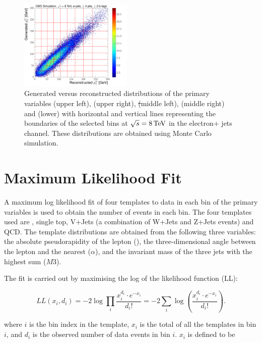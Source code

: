 \begin{figure}[hbtp]
	 \includegraphics[width=0.48\textwidth]{Chapters/04_Analysis/04b_XSections/images/binning/electron_WPT_8TeV.pdf}\hfill
	 \caption{Generated versus reconstructed distributions of the primary variables \met (upper left), \HT (upper
	 right), \st (middle left), \mt (middle right) and \wpt (lower) with horizontal and vertical lines
	 representing the boundaries of the selected bins at $\sqrt{s}=8\,\text{Te\hspace{-.08em}V}$ in the electron+ jets channel. These
	 distributions are obtained using \ttbar Monte Carlo simulation.}
     \label{fig:binning_8TeV_electron}
 \end{figure}
\FloatBarrier

\section{Maximum Likelihood Fit}
\label{maximum_likelihood_fit}
A maximum log likelihood fit of four templates to data in each bin of the primary variables is used to obtain
the number of events in each bin. The four templates used are \ttbar, single top, V+Jets (a combination of
W+Jets and Z+Jets events) and QCD. The template distributions are obtained from the following three
variables: the absolute pseudorapidity of the lepton (\abseta), the three-dimensional angle between the lepton
and the nearest \bjet ($\alpha$), and the invariant mass of the three jets with the highest \pt sum ($M3$).

The fit is carried out by maximising the log of the likelihood function (LL):

\begin{equation}
\label{log_likelihood}
LL\left(x_i, d_i\right) = -2 \log{\prod\limits_{i}\frac{x_i^{d_i}\cdot
e^{-x_i}}{d_i!}}=-2\sum\limits_{i}\log{\left(\frac{x_i^{d_i}\cdot e^{-x_i}}{d_i!}\right)}.
\end{equation}

where $i$ is the bin index in the template, $x_i$ is the total of all the templates in bin $i$, and $d_i$ is
the observed number of data events in  bin $i$. $x_i$ is defined to be

